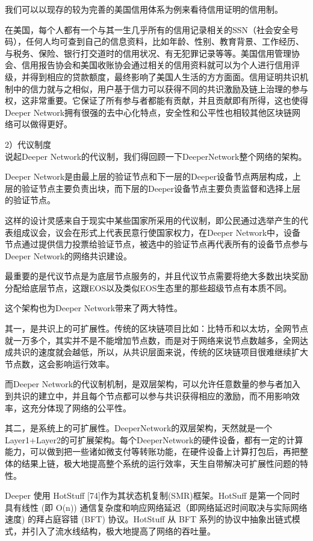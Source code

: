 \documentclass[a4paper]{article}
\begin{document}
我们可以以现存的较为完善的美国信⽤体系为例来看待信用证明的信用制。

在美国，每个人都有一个与其一生几乎所有的信用记录相关的SSN（社会安全号码），任何人均可查到自己的信息资料，比如年龄、性别、教育背景、工作经历、与税务、保险、银行打交道时的信用状况、有无犯罪记录等等。美国信用管理协会、信用报告协会和美国收账协会通过相关的信用资料就可以为个人进行信用评级，并得到相应的贷款额度，最终影响了美国人生活的方方面面。信用证明共识机制中的信力就与之相似，用户基于信力可以获得不同的共识激励及链上治理的参与权，这非常重要。它保证了所有参与者都能有贡献，并且贡献即有所得，这也使得Deeper Network拥有很强的去中心化特点，安全性和公平性也相较其他区块链网络可以做得更好。

2）代议制度\\
说起Deeper Network的代议制，我们得回顾一下DeeperNetwork整个网络的架构。

Deeper Network是由最上层的验证节点和下一层的Deeper设备节点两层构成，上层的验证节点主要负责出块，而下层的Deeper设备节点主要负责监督和选择上层的验证节点。

这样的设计灵感来自于现实中某些国家所采用的代议制，即公民通过选举产生的代表组成议会，议会在形式上代表民意行使国家权力，在Deeper Network中，设备节点通过提供信力投票给验证节点，被选中的验证节点再代表所有的设备节点参与Deeper Network的网络共识建设。

最重要的是代议节点是为底层节点服务的，并且代议节点需要将绝大多数出块奖励分配给底层节点，这跟EOS以及类似EOS生态里的那些超级节点有本质不同。

这个架构也为Deeper Network带来了两大特性。

其一，是共识上的可扩展性。传统的区块链项目比如：比特币和以太坊，全网节点就一万多个，其实并不是不能增加节点数，而是对于网络来说节点数越多，全网达成共识的速度就会越低，所以，从共识层面来说，传统的区块链项目很难继续扩大节点数，这会影响运行效率。

⽽Deeper Network的代议制机制，是双层架构，可以允许任意数量的参与者加入到共识的建立中，并且每个节点都可以参与共识获得相应的激励，而不用影响效率，这充分体现了网络的公平性。

其二，是系统上的可扩展性。DeeperNetwork的双层架构，天然就是一个Layer1+Layer2的可扩展架构。每个DeeperNetwork的硬件设备，都有一定的计算能力，可以做到把一些诸如微支付等转账功能，在硬件设备上计算打包后，再把整体的结果上链，极大地提高整个系统的运行效率，天生自带解决可扩展性问题的特性。


Deeper 使用 HotStuff [74]作为其状态机复制(SMR)框架。HotSuff 是第一个同时具有线性 (即 O(n)) 通信复杂度和响应网络延迟（即网络延迟时间取决与实际网络速度) 的拜占庭容错 (BFT) 协议。HotStuff 从 BFT 系列的协议中抽象出链式模式，并引入了流水线结构，极大地提高了网络的吞吐量。
\end{document}

